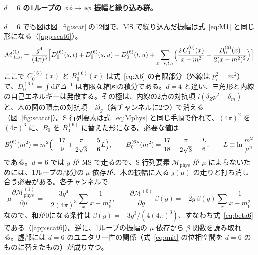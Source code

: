 \documentclass[a4paper,10pt]{ltjsarticle}
\newcommand{\dd}{\mathrm{d}}
\begin{document}
\paragraph{$d=6$ の1ループの $\phi\phi\to\phi\phi$ 振幅と繰り込み群。}$d=6$ でも図は図~\ref{fig:scat} の12個で、$\overline{\mathrm{MS}}$ で繰り込んだ振幅は式~\eqref{eq:M1} と同じ形になる（\ref{app:scat6}）。
\begin{equation}
\mathcal{M}^{(1)}_{d=6}=\frac{g^4}{(4\pi)^3}\Bigl[D_0^{(6)}(s,t)+D_0^{(6)}(s,u)+D_0^{(6)}(t,u)+\sum_{x=s,t,u}\Bigl(\frac{2\,C_0^{(6)}(x)}{x-m^2}+\frac{B_0^{(6)}(x)}{2(x-m^2)^2}\Bigr)\Bigr]
\label{eq:M6}
\end{equation}
ここで $C_0^{(6)}(x)$ と $B_0^{(6)}(x)$ は式~\eqref{eq:X6} の有限部分（外線は $p_i^2=m^2$）で、$D_0^{(6)}=\int\dd F\,\Delta^{-1}$ は有限な箱図の積分である。$d=4$ と違い、三角形と内線の自己エネルギーは発散する。その極は、内線の2点の対抗項 $i(\delta_Zp^2-\delta_m)$ と、木の図の頂点の対抗項 $-i\delta_g$（各チャンネルに2つ）で消える（図~\ref{fig:scatct}）。S 行列要素は式~\eqref{eq:Mphys} と同じ手順で作れて、$(4\pi)^2$ を $(4\pi)^3$ に、$B_0$ を $B_0^{(6)}$ に替えた形になる。必要な値は
\begin{equation}
B_0^{(6)}(m^2)=m^2\Bigl(-\frac{17}{9}+\frac{\pi}{2\sqrt3}+\frac56L\Bigr),\qquad
B_0^{(6)\prime}(m^2)=\frac{17}{18}-\frac{\pi}{2\sqrt3}-\frac L6,\qquad L\equiv\ln\frac{m^2}{\mu^2}
\label{eq:B06m}
\end{equation}
である。$d=6$ では $g$ が $\overline{\mathrm{MS}}$ で走るので、S 行列要素 $\mathcal{M}_{\mathrm{phys}}$ が $\mu$ によらないためには、1ループの部分の $\mu$ 依存が、木の振幅に入る $g(\mu)$ の走りと打ち消し合う必要がある。各チャンネルで
\begin{equation}
\mu\frac{\partial\mathcal{M}^{(1)}_{\mathrm{phys}}}{\partial\mu}=-\frac{3g^4}{2(4\pi)^3}\sum_x\frac{1}{x-m_{\mathrm p}^2},\qquad
\frac{\partial\mathcal{M}^{(0)}}{\partial g}\,\beta(g)=-2g\,\beta(g)\sum_x\frac{1}{x-m_{\mathrm p}^2}
\label{eq:rg6}
\end{equation}
なので、和が0になる条件は $\beta(g)=-3g^3/(4(4\pi)^3)$、すなわち式~\eqref{eq:beta6} である（\ref{app:scat6}）。逆に、1ループの振幅の $\mu$ 依存から $\beta$ 関数を読み取れる。虚部には $d=6$ のユニタリー性の関係（式~\eqref{eq:unit} の位相空間を $d=6$ のものに替えたもの）が成り立つ。
\end{document}
